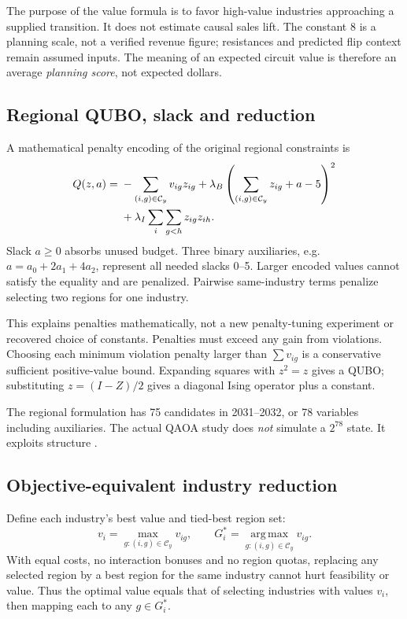 \documentclass[11pt,letterpaper]{article}
\begin{document}
The purpose of the value formula is to favor high-value industries approaching a supplied transition. It does not estimate causal sales lift. The constant 8 is a planning scale, not a verified revenue figure; resistances and predicted flip context remain assumed inputs. The meaning of an expected circuit value is therefore an average \emph{planning score}, not expected dollars.
\subsection{Regional QUBO, slack and reduction}\label{sec:qubo}
A mathematical penalty encoding of the original regional constraints is
\begin{align}
 Q(z,a)={}&-\sum_{(i,g)\in\mathcal C_y}v_{ig}z_{ig}
 +\lambda_B\left(\sum_{(i,g)\in\mathcal C_y}z_{ig}+a-5\right)^2\notag\\
 &+\lambda_I\sum_i\sum_{g<h}z_{ig}z_{ih}.\label{eq:qubo}
\end{align}
Slack $a\geq0$ absorbs unused budget. Three binary auxiliaries, e.g. $a=a_0+2a_1+4a_2$, represent all needed slacks 0--5. Larger encoded values cannot satisfy the equality and are penalized. Pairwise same-industry terms penalize selecting two regions for one industry.

This explains penalties mathematically, not a new penalty-tuning experiment or recovered choice of constants. Penalties must exceed any gain from violations. Choosing each minimum violation penalty larger than $\sum v_{ig}$ is a conservative sufficient positive-value bound. Expanding squares with $z^2=z$ gives a QUBO; substituting $z=(I-Z)/2$ gives a diagonal Ising operator plus a constant.

The regional formulation has 75 candidates in 2031--2032, or 78 variables including auxiliaries. The actual QAOA study does \emph{not} simulate a $2^{78}$ state. It exploits structure \cite{target}.

\subsection{Objective-equivalent industry reduction}
Define each industry's best value and tied-best region set:
\begin{equation}
 v_i=\max_{g:(i,g)\in\mathcal C_y}v_{ig},\qquad
 G_i^*=\operatorname*{arg\,max}_{g:(i,g)\in\mathcal C_y}v_{ig}.
\end{equation}
With equal costs, no interaction bonuses and no region quotas, replacing any selected region by a best region for the same industry cannot hurt feasibility or value. Thus the optimal value equals that of selecting industries with values $v_i$, then mapping each to any $g\in G_i^*$.
\end{document}
